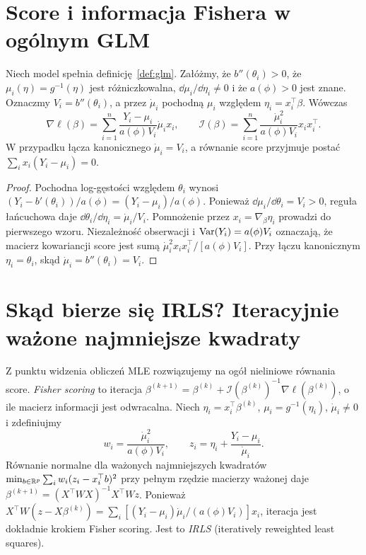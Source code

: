 \section{Score i informacja Fishera w ogólnym GLM}
\begin{twierdzenie}
\label{thm:glm-general-score}
Niech model spełnia definicję~\ref{def:glm}.
Załóżmy, że $b''(\theta_i)>0$, że
$\mu_i(\eta)=g^{-1}(\eta)$ jest różniczkowalna,
$\dd\mu_i/\dd\eta_i\ne0$ i że $a(\phi)>0$
jest znane. Oznaczmy $V_i=b''(\theta_i)$,
a przez $\dot\mu_i$ pochodną $\mu_i$ względem
$\eta_i=x_i^\top\beta$. Wówczas
\[
 \nabla\ell(\beta)=\sum_{i=1}^n
 \frac{Y_i-\mu_i}{a(\phi)V_i}\dot\mu_i x_i,
 \qquad
 \mathcal I(\beta)=\sum_{i=1}^n
 \frac{\dot\mu_i^2}{a(\phi)V_i}x_ix_i^\top.
\]
W przypadku łącza kanonicznego
$\dot\mu_i=V_i$, a równanie score przyjmuje postać
$\sum_i x_i(Y_i-\mu_i)=0$.
\end{twierdzenie}
\begin{proof}
Pochodna log-gęstości względem $\theta_i$ wynosi
$(Y_i-b'(\theta_i))/a(\phi)=(Y_i-\mu_i)/a(\phi)$.
Ponieważ $\dd\mu_i/\dd\theta_i=V_i>0$,
reguła łańcuchowa daje
$\dd\theta_i/\dd\eta_i=\dot\mu_i/V_i$.
Pomnożenie przez $x_i=\nabla_\beta\eta_i$ prowadzi
do pierwszego wzoru. Niezależność obserwacji i
$\operatorname{Var}(Y_i)=a(\phi)V_i$ oznaczają, że macierz
kowariancji score jest sumą
$\dot\mu_i^2x_ix_i^\top/[a(\phi)V_i]$.
Przy łączu kanonicznym $\eta_i=\theta_i$, skąd
$\dot\mu_i=b''(\theta_i)=V_i$.
\end{proof}

\section{Skąd bierze się IRLS? Iteracyjnie ważone najmniejsze kwadraty}
Z punktu widzenia obliczeń MLE rozwiązujemy na ogół
nieliniowe równania score. \emph{Fisher scoring} to
iteracja $\beta^{(k+1)}=\beta^{(k)}+
\mathcal I(\beta^{(k)})^{-1}\nabla\ell(\beta^{(k)})$,
o ile macierz informacji jest odwracalna.
Niech $\eta_i=x_i^\top\beta^{(k)}$, $\mu_i=g^{-1}(\eta_i)$,
$\dot\mu_i\ne0$ i zdefiniujmy
\[
 w_i=\frac{\dot\mu_i^2}{a(\phi)V_i},\qquad
 z_i=\eta_i+\frac{Y_i-\mu_i}{\dot\mu_i}.
\]
Równanie normalne dla ważonych najmniejszych kwadratów
$\min_{b\in\mathbb R^p}\sum_iw_i(z_i-x_i^\top b)^2$
przy pełnym rzędzie macierzy ważonej daje
$\beta^{(k+1)}=(X^\top WX)^{-1}X^\top Wz$.
Ponieważ
$X^\top W(z-X\beta^{(k)})=
\sum_i[(Y_i-\mu_i)\dot\mu_i/(a(\phi)V_i)]x_i$,
iteracja jest dokładnie krokiem Fisher scoring.
Jest to \emph{IRLS} (iteratively reweighted least squares).

